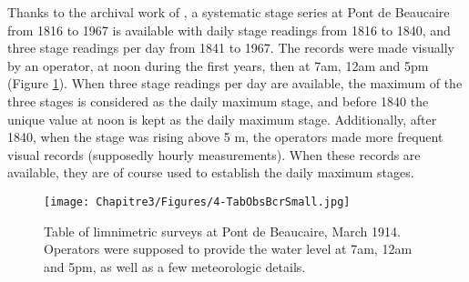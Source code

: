     Thanks to the archival work of \citet{pichard_hydro-climatology_2017}, a systematic stage series at Pont de Beaucaire from 1816 to 1967 is available with daily stage readings from 1816 to 1840, and three stage readings per day from 1841 to 1967. The records were made visually by an operator, at noon during the first years, then at 7am, 12am and 5pm (Figure \ref{fig:TabObsPt}). When three stage readings per day are available, the maximum of the three stages is considered as the daily maximum stage, and before 1840 the unique value at noon is kept as the daily maximum stage. Additionally, after 1840, when the stage was rising above 5 m, the operators made more frequent visual records (supposedly hourly measurements). When these records are available, they are of course used to establish the daily maximum stages.
    
        \begin{figure}[h!]
            \centering
            \texttt{[image: Chapitre3/Figures/4-TabObsBcrSmall.jpg]}
            \caption{Table of limnimetric surveys at Pont de Beaucaire, March 1914. Operators were supposed to provide the water level at 7am, 12am and 5pm, as well as a few meteorologic details. \citep{pontschaussees_observations_1914}}
            \label{fig:TabObsPt}
        \end{figure}
        
